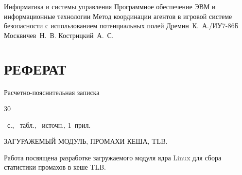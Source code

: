 \documentclass{bmstu}
\begin{document}
\makethesistitle
{Информатика и системы управления}
{Программное обеспечение ЭВМ и информационные технологии}
{Метод координации агентов в игровой системе безопасности с использованием потенциальных полей}
{Дремин~К.~А./ИУ7-86Б}
{Москвичев~Н.~В.} %
{}
{Кострицкий~А.~С.}

\newenvironment{essay2}[1]
{
	\chapter*{РЕФЕРАТ}
	
	Расчетно-пояснительная записка \begin{NoHyper}30\end{NoHyper}~с., \tottab~табл., \thetotbibentries~источн.,  1~прил.
	
	\MakeUppercase{#1} \par
}{}

\setcounter{page}{5}
\begin{essay2}{загуражемый модуль, промахи кеша, TLB.}
	Работа посвящена разработке загружаемого модуля ядра Linux для сбора статистики промахов в кеше TLB.
	
	\iffalse
	В результате работы был проведен анализ предметной области координации агентов в многоагентных системах, описаны основные методы решения задачи.
	Сформулированы критерии сравнения и классификации описанных методов и выполнен их сравнительный анализ.
	\fi
\end{essay2}


\clearpage
{}
\setlength{\cftbeforetoctitleskip}{-22pt}
\renewcommand{\cftaftertoctitle}{\hfill}
\renewcommand{\contentsname}{\hfill\LARGE СОДЕРЖАНИЕ\hfill}
\tableofcontents

%
%



%
%
%
%
%


{}
{}
\printbibliography[title=СПИСОК ИСПОЛЬЗОВАННЫХ ИСТОЧНИКОВ]


\end{document}
